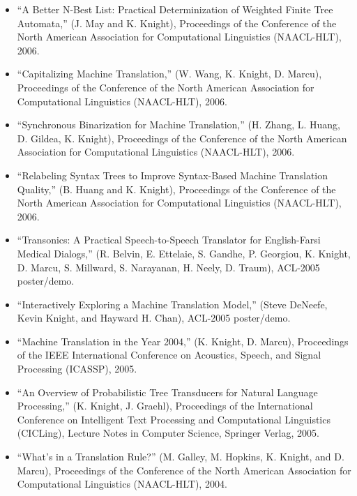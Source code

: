 \begin{itemize}
\item ``A Better N-Best List:  Practical Determinization of Weighted
Finite Tree Automata,''
(J. May and K. Knight), 
Proceedings of the Conference of the 
North American Association for Computational Linguistics (NAACL-HLT), 
2006.  

\item ``Capitalizing Machine Translation,''
(W. Wang, K. Knight, D. Marcu), 
Proceedings of the Conference of the 
North American Association for Computational Linguistics (NAACL-HLT), 
2006.  

\item ``Synchronous Binarization for Machine Translation,''
(H. Zhang, L. Huang, D. Gildea, K. Knight), 
Proceedings of the Conference of the 
North American Association for Computational Linguistics (NAACL-HLT), 
2006. 

\item ``Relabeling Syntax Trees to Improve Syntax-Based Machine
Translation Quality,''
(B. Huang and K. Knight), 
Proceedings of the Conference of the 
North American Association for Computational Linguistics (NAACL-HLT), 
2006.  

\item ``Transonics: A Practical Speech-to-Speech Translator for English-Farsi Medical Dialogs,'' (R. Belvin, E. Ettelaie, S. Gandhe, P. Georgiou, K. Knight, D. Marcu, S. Millward, S. Narayanan, H. Neely, D. Traum), ACL-2005 poster/demo.

\item ``Interactively Exploring a Machine Translation Model,''
(Steve DeNeefe, Kevin Knight, and Hayward H. Chan), ACL-2005 poster/demo.

\item ``Machine Translation in the Year 2004,'' (K. Knight, D. Marcu), 
Proceedings of the IEEE International Conference on Acoustics,
Speech, and Signal Processing (ICASSP), 2005. 

\item ``An Overview of Probabilistic Tree Transducers for 
Natural Language Processing,'' (K. Knight, J. Graehl), Proceedings of
the International Conference on Intelligent Text Processing 
and Computational Linguistics (CICLing), Lecture Notes in Computer 
Science, Springer Verlag, 2005.

\item ``What's in a Translation Rule?'' (M. Galley, M. Hopkins,
K. Knight, and D. Marcu), 
Proceedings of the Conference of the 
North American Association for Computational Linguistics (NAACL-HLT), 
2004.


\end{itemize}

